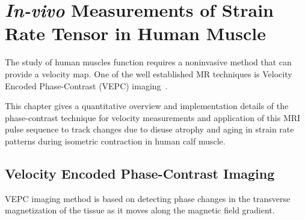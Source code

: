 \chapter{\textit{In-vivo} Measurements of Strain Rate Tensor in Human Muscle}
\label{ch: VEPC}
The study of human muscles function requires a noninvasive method that can provide a velocity map.
One of the well established MR techniques is Velocity Encoded Phase-Contrast (VEPC) imaging~\cite{Morse:1970ux, Pelc:1991vr}.

This chapter gives a quantitative overview and implementation details of the phase-contrast technique for velocity measurements and application of this MRI pulse sequence to track changes due to disuse atrophy and aging in strain rate patterns during isometric contraction in human calf muscle.
\section{Velocity Encoded Phase-Contrast Imaging}
VEPC imaging method is based on detecting phase changes in the transverse magnetization of the tissue as it moves along the magnetic field gradient.
